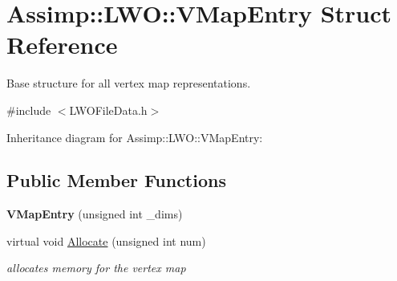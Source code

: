 \hypertarget{struct_assimp_1_1_l_w_o_1_1_v_map_entry}{\section{Assimp\+:\+:L\+W\+O\+:\+:V\+Map\+Entry Struct Reference}
\label{struct_assimp_1_1_l_w_o_1_1_v_map_entry}
}


Base structure for all vertex map representations.  




{\ttfamily \#include $<$L\+W\+O\+File\+Data.\+h$>$}



Inheritance diagram for Assimp\+:\+:L\+W\+O\+:\+:V\+Map\+Entry\+:
\subsection*{Public Member Functions}
\begin{DoxyCompactItemize}
\item 
\hypertarget{struct_assimp_1_1_l_w_o_1_1_v_map_entry_aa83794ded438610f97bf9885b9149149}{{\bfseries V\+Map\+Entry} (unsigned int \+\_\+dims)}\label{struct_assimp_1_1_l_w_o_1_1_v_map_entry_aa83794ded438610f97bf9885b9149149}

\item 
\hypertarget{struct_assimp_1_1_l_w_o_1_1_v_map_entry_a1513e108a0008027742cd5530fb7e0c1}{virtual void \hyperlink{struct_assimp_1_1_l_w_o_1_1_v_map_entry_a1513e108a0008027742cd5530fb7e0c1}{Allocate} (unsigned int num)}\label{struct_assimp_1_1_l_w_o_1_1_v_map_entry_a1513e108a0008027742cd5530fb7e0c1}

\begin{DoxyCompactList}\small\item\em allocates memory for the vertex map \end{DoxyCompactList}\end{DoxyCompactItemize}
